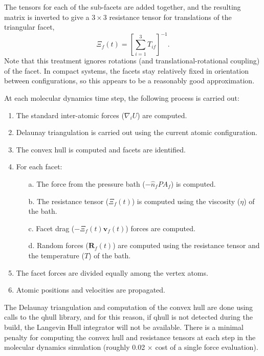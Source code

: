 \documentclass[]{book}
\begin{document}
The tensors for each of the sub-facets are added together, and the
resulting matrix is inverted to give a $3 \times 3$ resistance tensor
for translations of the triangular facet,
\begin{equation}
\Xi_f(t) =\left[\sum_{i=1}^3 T_{if}\right]^{-1}.
\end{equation}
Note that this treatment ignores rotations (and
translational-rotational coupling) of the facet.  In compact systems,
the facets stay relatively fixed in orientation between
configurations, so this appears to be a reasonably good approximation.

At each
molecular dynamics time step, the following process is carried out:
\begin{enumerate}
\item The standard inter-atomic forces ($\nabla_iU$) are computed.
\item Delaunay triangulation is carried out using the current atomic
  configuration.
\item The convex hull is computed and facets are identified.
\item For each facet:
\begin{itemize}
\item[a.] The force from the pressure bath ($-\hat{n}_fPA_f$) is
  computed.
\item[b.] The resistance tensor ($\Xi_f(t)$) is computed using the
  viscosity ($\eta$) of the bath.
\item[c.] Facet drag ($-\Xi_f(t) \mathbf{v}_f(t)$) forces are
  computed.
\item[d.] Random forces ($\mathbf{R}_f(t)$) are computed using the
  resistance tensor and the temperature ($T$) of the bath.
\end{itemize}
\item The facet forces are divided equally among the vertex atoms.
\item Atomic positions and velocities are propagated.
\end{enumerate}
The Delaunay triangulation and computation of the convex hull are done
using calls to the qhull library,\cite{Qhull} and for this reason, if
qhull is not detected during the build, the Langevin Hull integrator
will not be available.  There is a minimal penalty for computing the
convex hull and resistance tensors at each step in the molecular
dynamics simulation (roughly 0.02 $\times$ cost of a single force
evaluation).
\end{document}
